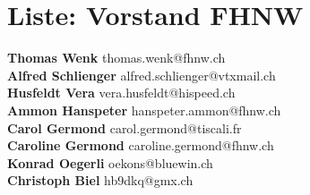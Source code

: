 \documentclass{scrartcl}
\begin{document}
\section*{Liste: Vorstand FHNW}
\textbf{Thomas Wenk } thomas.wenk@fhnw.ch\\
\textbf{Alfred Schlienger } alfred.schlienger@vtxmail.ch\\
\textbf{Husfeldt Vera } vera.husfeldt@hispeed.ch\\
\textbf{Ammon Hanspeter } hanspeter.ammon@fhnw.ch\\
\textbf{Carol Germond } carol.germond@tiscali.fr\\
\textbf{Caroline Germond } caroline.germond@fhnw.ch\\
\textbf{Konrad Oegerli } oekons@bluewin.ch\\
\textbf{Christoph Biel } hb9dkq@gmx.ch\\
\end{document}
